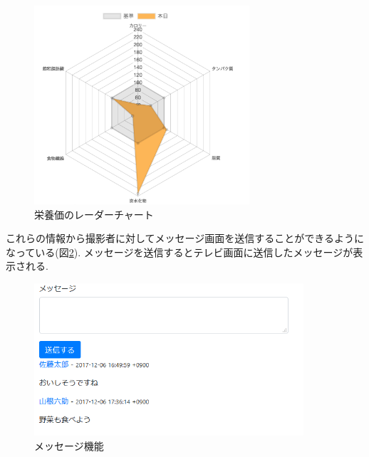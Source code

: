 \documentclass[../report]{subfiles}
\begin{document}
\begin{figure}[htbp]
    \begin{center}
        \includegraphics[width=8cm]{imgs/6_radar.png}
        \caption{栄養価のレーダーチャート}
        \label{fig:radar}
    \end{center}
\end{figure}

これらの情報から撮影者に対してメッセージ画面を送信することができるようになっている(図\ref{fig:message}).
メッセージを送信するとテレビ画面に送信したメッセージが表示される.

\begin{figure}[htbp]
    \begin{center}
        \includegraphics[width=10cm]{imgs/5_day3.png}
        \caption{メッセージ機能}
        \label{fig:message}
    \end{center}
\end{figure}
\end{document}
